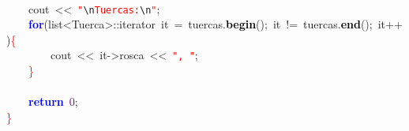 \mbox{} \\
\mbox{}\ \ \ \ cout\ \textcolor{BrickRed}{\textless{}\textless{}}\ \texttt{\textcolor{Red}{"{}}}\texttt{\textcolor{CarnationPink}{\textbackslash{}n}}\texttt{\textcolor{Red}{Tuercas:}}\texttt{\textcolor{CarnationPink}{\textbackslash{}n}}\texttt{\textcolor{Red}{"{}}}\textcolor{BrickRed}{;} \\
\mbox{}\ \ \ \ \textbf{\textcolor{Blue}{for}}\textcolor{BrickRed}{(}list\textcolor{BrickRed}{\textless{}}Tuerca\textcolor{BrickRed}{\textgreater{}::}\textcolor{TealBlue}{iterator}\ it\ \textcolor{BrickRed}{=}\ tuercas\textcolor{BrickRed}{.}\textbf{\textcolor{Black}{begin}}\textcolor{BrickRed}{();}\ it\ \textcolor{BrickRed}{!=}\ tuercas\textcolor{BrickRed}{.}\textbf{\textcolor{Black}{end}}\textcolor{BrickRed}{();}\ it\textcolor{BrickRed}{++)}\textcolor{Red}{\{} \\
\mbox{}\ \ \ \ \ \ \ \ cout\ \textcolor{BrickRed}{\textless{}\textless{}}\ it\textcolor{BrickRed}{-\textgreater{}}rosca\ \textcolor{BrickRed}{\textless{}\textless{}}\ \texttt{\textcolor{Red}{"{},\ "{}}}\textcolor{BrickRed}{;} \\
\mbox{}\ \ \ \ \textcolor{Red}{\}}\ \ \ \  \\
\mbox{} \\
\mbox{}\ \ \ \ \textbf{\textcolor{Blue}{return}}\ \textcolor{Purple}{0}\textcolor{BrickRed}{;} \\
\mbox{}\textcolor{Red}{\}} \\
\mbox{}
